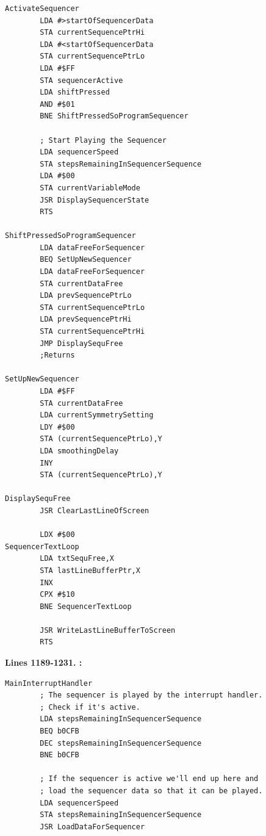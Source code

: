 \clearpage
\begin{lstlisting}[basicstyle=\ttfamily\scriptsize,caption=\icode{ActivateSequencer} displays the sequencer programming screen (\icode{ShiftPressedSoProgramSequencer}) or activates the sequencer\, depending on whether the user has pressed 'Shift' in combination with 'Q' or not.]
ActivateSequencer 
        LDA #>startOfSequencerData
        STA currentSequencePtrHi
        LDA #<startOfSequencerData
        STA currentSequencePtrLo
        LDA #$FF
        STA sequencerActive
        LDA shiftPressed
        AND #$01
        BNE ShiftPressedSoProgramSequencer

        ; Start Playing the Sequencer
        LDA sequencerSpeed
        STA stepsRemainingInSequencerSequence
        LDA #$00
        STA currentVariableMode
        JSR DisplaySequencerState
        RTS 

ShiftPressedSoProgramSequencer   
        LDA dataFreeForSequencer
        BEQ SetUpNewSequencer
        LDA dataFreeForSequencer
        STA currentDataFree
        LDA prevSequencePtrLo
        STA currentSequencePtrLo
        LDA prevSequencePtrHi
        STA currentSequencePtrHi
        JMP DisplaySequFree
        ;Returns

SetUpNewSequencer   
        LDA #$FF
        STA currentDataFree
        LDA currentSymmetrySetting
        LDY #$00
        STA (currentSequencePtrLo),Y
        LDA smoothingDelay
        INY 
        STA (currentSequencePtrLo),Y

DisplaySequFree    
        JSR ClearLastLineOfScreen

        LDX #$00
SequencerTextLoop   
        LDA txtSequFree,X
        STA lastLineBufferPtr,X
        INX 
        CPX #$10
        BNE SequencerTextLoop

        JSR WriteLastLineBufferToScreen
        RTS 
\end{lstlisting}
\clearpage

\textbf{Lines 1189-1231. :} 
\clearpage

\begin{lstlisting}[caption=\icode{ActivateSequencer} displays the sequencer programming screen (\icode{ShiftPressedSoProgramSequencer}) or activates the sequencer\, depending on whether the user has pressed 'Shift' in combination with 'Q' or not.]
MainInterruptHandler
        ; The sequencer is played by the interrupt handler.
        ; Check if it's active.
        LDA stepsRemainingInSequencerSequence
        BEQ b0CFB
        DEC stepsRemainingInSequencerSequence
        BNE b0CFB

        ; If the sequencer is active we'll end up here and
        ; load the sequencer data so that it can be played.
        LDA sequencerSpeed
        STA stepsRemainingInSequencerSequence
        JSR LoadDataForSequencer
\end{lstlisting}

